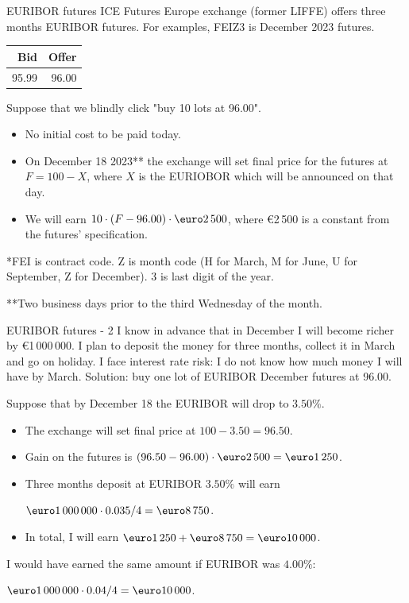 \documentclass{beamer}
\renewcommand{\EUR}[1]{\textup{\euro}#1}
\begin{document}
\begin{frame}{EURIBOR futures}
\justify
ICE Futures Europe exchange (former LIFFE) offers three months EURIBOR futures. For examples, \alert{FEIZ3} is December 2023 futures.

\justify
\centering
\begin{tabular}{r|r}
Bid & Offer \\ \hline
95.99 & 96.00
\end{tabular}

\justify
Suppose that we blindly click "buy 10 lots at 96.00".
\begin{itemize}
\justifying
\item No initial cost to be paid today.
\item On December 18 2023** the exchange will set final price for the futures at $F = 100 - X$, where 
$X$ is the EURIOBOR which will be announced on that day.
\item We will earn $10 \cdot (F - 96.00) \cdot \EUR{2\,500}$, where \EUR{2\,500} is a constant from the futures' specification.
\end{itemize}

\justify
*FEI is contract code. Z is month code (H for March, M for June, U for September, Z for December). 3 is last digit of the year.

\justify
**Two business days prior to the third Wednesday of the month.
\end{frame}



\begin{frame}{EURIBOR futures - 2}
\justify
I know in advance that in December I will become richer by \EUR{1\,000\,000}. I plan to deposit the money for three months, collect it in March and go on holiday. I face \alert{interest rate risk}: I do not know how  much money I will have by March.
\justify
Solution: buy one lot of EURIBOR December futures at 96.00.

\justify
Suppose that by December 18 the EURIBOR will drop to $3.50\%$.
\begin{itemize}
\justifying
\item The exchange will set final price at $100 - 3.50 = 96.50$.
\item Gain on the futures is $(96.50-96.00)\cdot\EUR{2\,500} = \EUR{1\,250}$.
\item Three months deposit at EURIBOR $3.50\%$ will earn

$\EUR{1\,000\,000} \cdot 0.035 / 4 = \EUR{8\,750}$.
\item In total, I will earn $\EUR{1\,250} + \EUR{8\,750} = \EUR{10\,000}$.
\end{itemize} 

\justify
I would have earned the same amount if EURIBOR was $4.00\%$:

$\EUR{1\,000\,000} \cdot 0.04/4 =\EUR{10\,000}$.
\end{frame}
\end{document}
